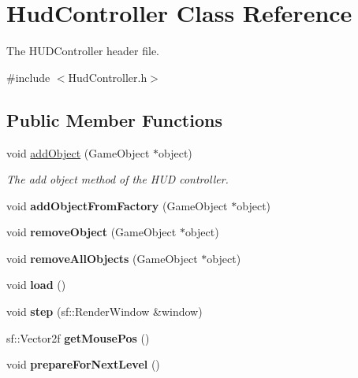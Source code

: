 \hypertarget{class_hud_controller}{\section{Hud\-Controller Class Reference}
\label{class_hud_controller}
}


The H\-U\-D\-Controller header file.  




{\ttfamily \#include $<$Hud\-Controller.\-h$>$}

\subsection*{Public Member Functions}
\begin{DoxyCompactItemize}
\item 
\hypertarget{class_hud_controller_a27862a3db822f65de6dbcf22835ec58a}{void \hyperlink{class_hud_controller_a27862a3db822f65de6dbcf22835ec58a}{add\-Object} (Game\-Object $\ast$object)}\label{class_hud_controller_a27862a3db822f65de6dbcf22835ec58a}

\begin{DoxyCompactList}\small\item\em The add object method of the H\-U\-D controller. \end{DoxyCompactList}\item 
\hypertarget{class_hud_controller_abaab3a30a47733b2588236100267e206}{void {\bfseries add\-Object\-From\-Factory} (Game\-Object $\ast$object)}\label{class_hud_controller_abaab3a30a47733b2588236100267e206}

\item 
\hypertarget{class_hud_controller_ab07bc4161257a8fbc16df56ed9dbf1ea}{void {\bfseries remove\-Object} (Game\-Object $\ast$object)}\label{class_hud_controller_ab07bc4161257a8fbc16df56ed9dbf1ea}

\item 
\hypertarget{class_hud_controller_aac63180083695594ae2d17278c13d604}{void {\bfseries remove\-All\-Objects} (Game\-Object $\ast$object)}\label{class_hud_controller_aac63180083695594ae2d17278c13d604}

\item 
\hypertarget{class_hud_controller_abeeed176eb5114ce613c499135c528d4}{void {\bfseries load} ()}\label{class_hud_controller_abeeed176eb5114ce613c499135c528d4}

\item 
\hypertarget{class_hud_controller_a6cd82988ca9221b6cb8d520a8e26b204}{void {\bfseries step} (sf\-::\-Render\-Window \&window)}\label{class_hud_controller_a6cd82988ca9221b6cb8d520a8e26b204}

\item 
\hypertarget{class_hud_controller_a4c6c9c53841c41d156a2f715a43be703}{sf\-::\-Vector2f {\bfseries get\-Mouse\-Pos} ()}\label{class_hud_controller_a4c6c9c53841c41d156a2f715a43be703}

\item 
\hypertarget{class_hud_controller_a9e9c4e19bdb0bc55247c96e79c5548c3}{void {\bfseries prepare\-For\-Next\-Level} ()}\label{class_hud_controller_a9e9c4e19bdb0bc55247c96e79c5548c3}

\end{DoxyCompactItemize}
